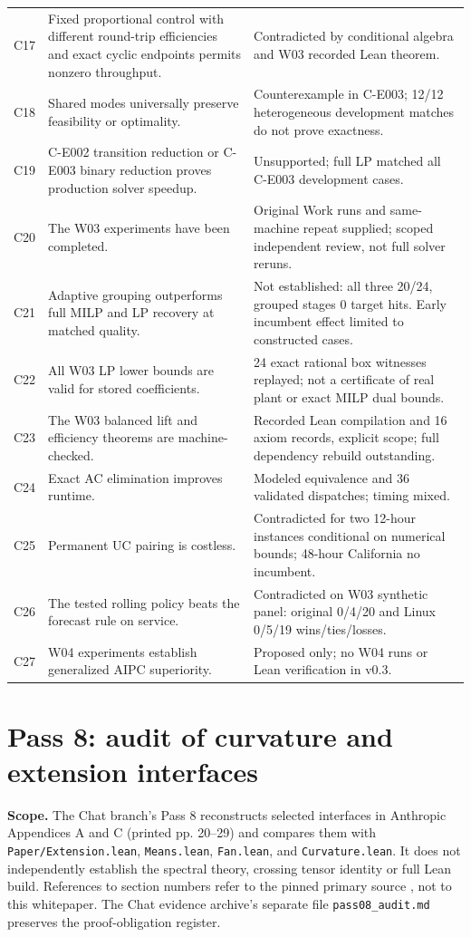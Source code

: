 \documentclass[11pt,letterpaper]{article}
\begin{document}
\begin{longtable}{P{.10\linewidth}P{.46\linewidth}P{.35\linewidth}}
C17 & Fixed proportional control with different round-trip efficiencies and exact cyclic endpoints permits nonzero throughput. & Contradicted by conditional algebra and W03 recorded Lean theorem.\\
C18 & Shared modes universally preserve feasibility or optimality. & Counterexample in C-E003; 12/12 heterogeneous development matches do not prove exactness.\\
C19 & C-E002 transition reduction or C-E003 binary reduction proves production solver speedup. & Unsupported; full LP matched all C-E003 development cases.\\
C20 & The W03 experiments have been completed. & Original Work runs and same-machine repeat supplied; scoped independent review, not full solver reruns.\\
C21 & Adaptive grouping outperforms full MILP and LP recovery at matched quality. & Not established: all three 20/24, grouped stages 0 target hits. Early incumbent effect limited to constructed cases.\\
C22 & All W03 LP lower bounds are valid for stored coefficients. & 24 exact rational box witnesses replayed; not a certificate of real plant or exact MILP dual bounds.\\
C23 & The W03 balanced lift and efficiency theorems are machine-checked. & Recorded Lean compilation and 16 axiom records, explicit scope; full dependency rebuild outstanding.\\
C24 & Exact AC elimination improves runtime. & Modeled equivalence and 36 validated dispatches; timing mixed.\\
C25 & Permanent UC pairing is costless. & Contradicted for two 12-hour instances conditional on numerical bounds; 48-hour California no incumbent.\\
C26 & The tested rolling policy beats the forecast rule on service. & Contradicted on W03 synthetic panel: original 0/4/20 and Linux 0/5/19 wins/ties/losses.\\
C27 & W04 experiments establish generalized AIPC superiority. & Proposed only; no W04 runs or Lean verification in v0.3.\\
\bottomrule
\end{longtable}
\endgroup

\section{Pass 8: audit of curvature and extension interfaces}
\label{sec:pass08}
\textbf{Scope.} The Chat branch's Pass 8 reconstructs selected interfaces in Anthropic Appendices A and C (printed pp. 20--29) and compares them with \texttt{Paper/Extension.lean}, \texttt{Means.lean}, \texttt{Fan.lean}, and \texttt{Curvature.lean}. It does not independently establish the spectral theory, crossing tensor identity or full Lean build. References to section numbers refer to the pinned primary source \cite{anthropic}, not to this whitepaper. The Chat evidence archive's separate file \texttt{pass08\_audit.md} preserves the proof-obligation register.
\end{document}
